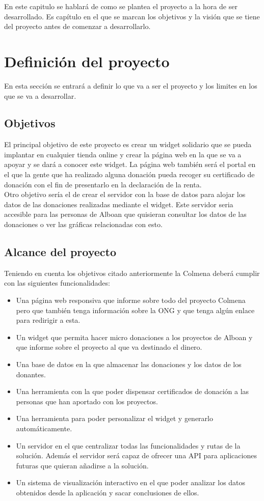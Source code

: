 En este capitulo se hablará de como se plantea el proyecto a la hora de ser desarrollado. Es capítulo en el que se marcan los objetivos y la visión que se tiene del proyecto antes de comenzar a desarrollarlo. 
				
\section{Definición del proyecto}
En esta sección se entrará a definir lo que va a ser el proyecto y los limites en los que se va a desarrollar.

\subsection{Objetivos}
El principal objetivo de este proyecto es crear un widget solidario que se pueda implantar en cualquier tienda online y crear la página web en la que se va a apoyar y se dará a conocer este widget. La página web también será el portal en el que la gente que ha realizado alguna donación pueda recoger su certificado de donación con el fin de presentarlo en la declaración de la renta.\\

Otro objetivo sería el de crear el servidor con la base de datos para alojar los datos de las donaciones realizadas mediante el widget. Este servidor seria accesible para las personas de Alboan que quisieran consultar los datos de las donaciones o ver las gráficas relacionadas con esto.

\subsection{Alcance del proyecto}
Teniendo en cuenta los objetivos citado anteriormente la Colmena deberá cumplir con las siguientes funcionalidades:

\begin{itemize}
	\item Una página web responsiva que informe sobre todo del proyecto Colmena pero que también tenga información sobre la ONG y que tenga algún enlace para redirigir a esta.
	\item Un widget que permita hacer micro donaciones a los proyectos de Alboan y que informe sobre el proyecto al que va destinado el dinero.
	\item Una base de datos en la que almacenar las donaciones y los datos de los donantes.
	\item Una herramienta con la que poder dispensar certificados de donación a las personas que han aportado con los proyectos.
	\item Una herramienta para poder personalizar el widget y generarlo automáticamente.
	\item Un servidor en el que centralizar todas las funcionalidades y rutas de la solución. Además el servidor será capaz de ofrecer una API para aplicaciones futuras que quieran añadirse a la solución.
	\item Un sistema de visualización interactivo en el que poder analizar los datos obtenidos desde la aplicación y sacar conclusiones de ellos.
\end{itemize}

